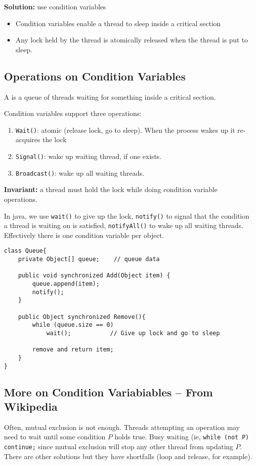 \textbf{Solution:} use condition variables
\begin{itemize}
    \item Condition variables enable a thread to sleep inside a critical section
    \item Any lock held by the thread is atomically released when the thread is
        put to sleep.
\end{itemize}

\subsection{Operations on Condition Variables}
\begin{dfn}
    A  is a queue of threads waiting for something
    inside a critical section.
\end{dfn}

Condition variables support three operations:
\begin{enumerate}
    \item \texttt{Wait()}: atomic (release lock, go to sleep). When the
        process wakes up it re-acquires the lock
    \item \texttt{Signal()}: wake up waiting thread, if one exists.
    \item \texttt{Broadcast()}: wake up all waiting threads.
\end{enumerate}

\textbf{Invariant:} a thread must hold the lock while doing condition variable
operations.

In java, we use \texttt{wait()} to give up the lock, \texttt{notify()} to signal
that the condition a thread is waiting on is satisfied, \texttt{notifyAll()} to
wake up all waiting threads. Effectively there is one condition variable per
object.

\begin{verbatim}
class Queue{
    private Object[] queue;    // queue data

    public void synchronized Add(Object item) {
        queue.append(item);
        notify();
    }

    public Object synchronized Remove(){
        while (queue.size == 0)
            wait();           // Give up lock and go to sleep

        remove and return item;
    }
}
\end{verbatim}


\subsection{More on Condition Variabiables -- From Wikipedia}
Often, mutual exclusion is not enough. Threads attempting an operation may need
to wait until some condition \(P\) holds true. Busy waiting (ie, \texttt{while
(not P) continue;} since mutual exclusion will stop any other thread from
updating \(P\). There are other solutions but they have shortfalls (loop and
release, for example).

